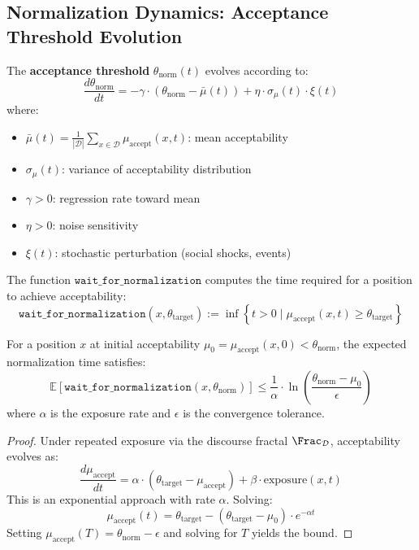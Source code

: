 \subsection{Normalization Dynamics: Acceptance Threshold Evolution}

\begin{definition}
\label{def:acceptance-dynamics}
The \textbf{acceptance threshold} $\theta_{\mathrm{norm}}(t)$ evolves according to:
\[
\boxed{
    \frac{d\theta_{\mathrm{norm}}}{dt} =
    -\gamma \cdot (\theta_{\mathrm{norm}} - \bar{\mu}(t)) +
    \eta \cdot \sigma_{\mu}(t) \cdot \xi(t)
}
\]
where:
\begin{itemize}
    \item $\bar{\mu}(t) = \frac{1}{|\mathcal{D}|} \sum_{x \in \mathcal{D}}
          \mu_{\mathrm{accept}}(x, t)$: mean acceptability
    \item $\sigma_{\mu}(t)$: variance of acceptability distribution
    \item $\gamma > 0$: regression rate toward mean
    \item $\eta > 0$: noise sensitivity
    \item $\xi(t)$: stochastic perturbation (social shocks, events)
\end{itemize}
\end{definition}

\begin{definition}
\label{def:wait-normalization}
The function $\mathtt{wait\_for\_normalization}$ computes the time required for a
position to achieve acceptability:
\[
\boxed{
    \mathtt{wait\_for\_normalization}(x, \theta_{\mathrm{target}}) :=
    \inf\left\{ t > 0 \;\Big|\; \mu_{\mathrm{accept}}(x, t) \geq \theta_{\mathrm{target}} \right\}
}
\]
\end{definition}

\begin{theorem}
\label{thm:normalization-time}
For a position $x$ at initial acceptability $\mu_0 = \mu_{\mathrm{accept}}(x, 0) <
\theta_{\mathrm{norm}}$, the expected normalization time satisfies:
\[
    \mathbb{E}\left[ \mathtt{wait\_for\_normalization}(x, \theta_{\mathrm{norm}}) \right]
    \leq \frac{1}{\alpha} \cdot \ln\left( \frac{\theta_{\mathrm{norm}} - \mu_0}{\epsilon} \right)
\]
where $\alpha$ is the exposure rate and $\epsilon$ is the convergence tolerance.
\end{theorem}

\begin{proof}
Under repeated exposure via the discourse fractal $\Frac_{\mathcal{D}}$, acceptability
evolves as:
\[
    \frac{d\mu_{\mathrm{accept}}}{dt} = \alpha \cdot (\theta_{\mathrm{target}} -
    \mu_{\mathrm{accept}}) + \beta \cdot \mathrm{exposure}(x, t)
\]
This is an exponential approach with rate $\alpha$. Solving:
\[
    \mu_{\mathrm{accept}}(t) = \theta_{\mathrm{target}} -
    (\theta_{\mathrm{target}} - \mu_0) \cdot e^{-\alpha t}
\]
Setting $\mu_{\mathrm{accept}}(T) = \theta_{\mathrm{norm}} - \epsilon$ and solving for $T$
yields the bound.
\end{proof}

